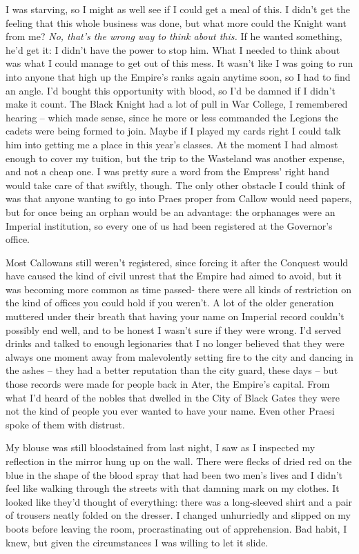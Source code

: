 \documentclass[12pt, openany]{book}
\begin{document}
I was starving, so I might as well see if I could get a meal of this. I didn’t get the feeling that this whole business was done, but what more could the Knight want from me? \textit{No, that’s the wrong way to think about this.} If he wanted something, he’d get it: I didn’t have the power to stop him. What I needed to think about was what I could manage to get out of this mess. It wasn’t like I was going to run into anyone that high up the Empire’s ranks again anytime soon, so I had to find an angle. I’d bought this opportunity with blood, so I’d be damned if I didn’t make it count. The Black Knight had a lot of pull in War College, I remembered hearing – which made sense, since he more or less commanded the Legions the cadets were being formed to join. Maybe if I played my cards right I could talk him into getting me a place in this year’s classes. At the moment I had almost enough to cover my tuition, but the trip to the Wasteland was another expense, and not a cheap one. I was pretty sure a word from the Empress’ right hand would take care of that swiftly, though. The only other obstacle I could think of was that anyone wanting to go into Praes proper from Callow would need papers, but for once being an orphan would be an advantage: the orphanages were an Imperial institution, so every one of us had been registered at the Governor’s office. 

Most Callowans still weren’t registered, since forcing it after the Conquest would have caused the kind of civil unrest that the Empire had aimed to avoid, but it was becoming more common as time passed- there were all kinds of restriction on the kind of offices you could hold if you weren’t. A lot of the older generation muttered under their breath that having your name on Imperial record couldn’t possibly end well, and to be honest I wasn’t sure if they were wrong. I’d served drinks and talked to enough legionaries that I no longer believed that they were always one moment away from malevolently setting fire to the city and dancing in the ashes – they had a better reputation than the city guard, these days – but those records were made for people back in Ater, the Empire’s capital. From what I’d heard of the nobles that dwelled in the City of Black Gates they were not the kind of people you ever wanted to have your name. Even other Praesi spoke of them with distrust.

My blouse was still bloodstained from last night, I saw as I inspected my reflection in the mirror hung up on the wall. There were flecks of dried red on the blue in the shape of the blood spray that had been two men’s lives and I didn’t feel like walking through the streets with that damning mark on my clothes. It looked like they’d thought of everything: there was a long-sleeved shirt and a pair of trousers neatly folded on the dresser. I changed unhurriedly and slipped on my boots before leaving the room, procrastinating out of apprehension. Bad habit, I knew, but given the circumstances I was willing to let it slide.
\end{document}
